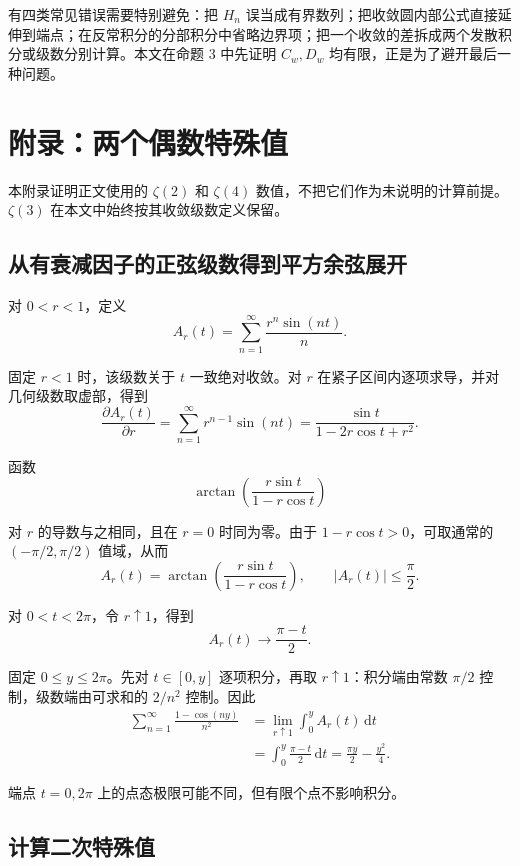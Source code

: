 \documentclass[11pt,a4paper]{article}
\begin{document}
有四类常见错误需要特别避免：把 \(H_n\) 误当成有界数列；把收敛圆内部公式直接延伸到端点；在反常积分的分部积分中省略边界项；把一个收敛的差拆成两个发散积分或级数分别计算。本文在命题 3 中先证明 \(C_w,D_w\) 均有限，正是为了避开最后一种问题。

\hypertarget{sec-11}{%
\section{附录：两个偶数特殊值}\label{sec-11}}

本附录证明正文使用的 \(\zeta(2)\) 和 \(\zeta(4)\) 数值，不把它们作为未说明的计算前提。\(\zeta(3)\) 在本文中始终按其收敛级数定义保留。

\hypertarget{sec-11-1}{%
\subsection{从有衰减因子的正弦级数得到平方余弦展开}\label{sec-11-1}}

对 \(0<r<1\)，定义
\[
A_r(t)=\sum_{n=1}^{\infty}\frac{r^n\sin(nt)}n.
\]

固定 \(r<1\) 时，该级数关于 \(t\) 一致绝对收敛。对 \(r\) 在紧子区间内逐项求导，并对几何级数取虚部，得到
\[
\frac{\partial A_r(t)}{\partial r}
=\sum_{n=1}^{\infty}r^{n-1}\sin(nt)
=\frac{\sin t}{1-2r\cos t+r^2}.
\]

函数
\[
\arctan\!\left(\frac{r\sin t}{1-r\cos t}\right)
\]

对 \(r\) 的导数与之相同，且在 \(r=0\) 时同为零。由于 \(1-r\cos t>0\)，可取通常的 \((-\pi/2,\pi/2)\) 值域，从而
\[
A_r(t)=\arctan\!\left(\frac{r\sin t}{1-r\cos t}\right),
\qquad |A_r(t)|\leqslant\frac\pi2.
\]

对 \(0<t<2\pi\)，令 \(r\uparrow1\)，得到
\[
A_r(t)\longrightarrow\frac{\pi-t}{2}.
\]

固定 \(0\leqslant y\leqslant2\pi\)。先对 \(t\in[0,y]\) 逐项积分，再取 \(r\uparrow1\)：积分端由常数 \(\pi/2\) 控制，级数端由可求和的 \(2/n^2\) 控制。因此
\[
\begin{aligned}
\sum_{n=1}^{\infty}\frac{1-\cos(ny)}{n^2}
&=\lim_{r\uparrow1}\int_0^y A_r(t)\,\mathrm dt\\
&=\int_0^y\frac{\pi-t}{2}\,\mathrm dt
=\frac{\pi y}{2}-\frac{y^2}{4}.
\end{aligned}
\]

端点 \(t=0,2\pi\) 上的点态极限可能不同，但有限个点不影响积分。

\hypertarget{sec-11-2}{%
\subsection{计算二次特殊值}\label{sec-11-2}}
\end{document}
